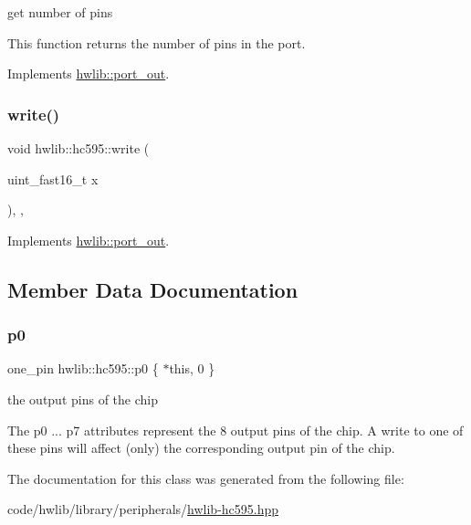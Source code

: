 get number of pins

This function returns the number of pins in the port. 

Implements \hyperlink{classhwlib_1_1port__out_a8593e2ff755b938797defb06c1e085df}{hwlib\+::port\+\_\+out}.

\mbox{\label{classhwlib_1_1hc595_a5cc052f6de8be418a6a3cb69919fd168}} 
\subsubsection{\texorpdfstring{write()}{write()}}
{\footnotesize\ttfamily void hwlib\+::hc595\+::write (\begin{DoxyParamCaption}\item[{uint\+\_\+fast16\+\_\+t}]{x }\end{DoxyParamCaption})\hspace{0.3cm}{\ttfamily [inline]}, {\ttfamily [override]}, {\ttfamily [virtual]}}







Implements \hyperlink{classhwlib_1_1port__out_a3644bf484ebe059ec5bf17fa43e0c01b}{hwlib\+::port\+\_\+out}.



\subsection{Member Data Documentation}
\mbox{\label{classhwlib_1_1hc595_a5e124516aa762629f95c7ab63e0b3d18}} 
\subsubsection{\texorpdfstring{p0}{p0}}
{\footnotesize\ttfamily one\+\_\+pin hwlib\+::hc595\+::p0 \{ $\ast$this, 0 \}}

the output pins of the chip

The p0 ... p7 attributes represent the 8 output pins of the chip. A write to one of these pins will affect (only) the corresponding output pin of the chip. 

The documentation for this class was generated from the following file\+:\begin{DoxyCompactItemize}
\item 
code/hwlib/library/peripherals/\hyperlink{hwlib-hc595_8hpp}{hwlib-\/hc595.\+hpp}\end{DoxyCompactItemize}
